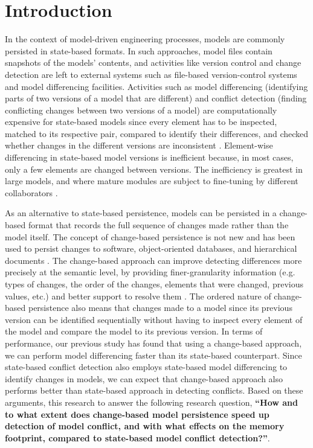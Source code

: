 \section{Introduction}
\label{sec:introduction}

In the context of model-driven engineering processes, models are commonly persisted in state-based formats. In such approaches, model files contain snapshots of the models' contents, and activities like version control and change detection are left to external systems such as file-based version-control systems and model differencing facilities. Activities such as model differencing (identifying parts of two versions of a model that are different) and conflict detection (finding conflicting changes between two versions of a model) are computationally expensive for state-based models \cite{Kolovos:2009:DMM:1564596.1564641} since every element has to be inspected, matched to its respective pair, compared to identify their differences, and checked whether changes in the different versions are inconsistent \cite{emfcompare2018developer}. Element-wise differencing in state-based model versions is inefficient because, in most cases, only a few elements are changed between versions. The inefficiency is greatest in large models, and where mature modules are subject to fine-tuning by different collaborators \cite{selic2003pragmatics}. 

As an alternative to state-based persistence, models can be persisted in a change-based format that records the full sequence of changes made rather than the model itself. The concept of change-based persistence is not new and has been used to persist changes to software, object-oriented databases, and hierarchical documents \cite{DBLP:journals/entcs/RobbesL07,DBLP:conf/sde/LippeO92,DBLP:conf/caise/IgnatN05}. The change-based approach can improve detecting differences more precisely at the semantic level, by providing finer-granularity information (e.g. types of changes, the order of the changes, 
elements that were changed, previous values, etc.) and better support to resolve them \cite{mens2002state}. The ordered nature of change-based persistence also means that changes made to a model since its previous version can be identified sequentially without having to inspect every element of the model and compare the model to its previous version. 
In terms of performance, our previous study \cite{yohannis2019efficient} has found that using a change-based approach, we can perform model differencing faster than its state-based counterpart. Since state-based conflict detection also employs state-based model differencing to identify changes in models, we can expect that change-based approach also performs better than state-based approach in detecting conflicts. Based on these arguments, this research to answer the following research question, \textbf{``How and to what extent does change-based model persistence speed up detection of model conflict, and with what effects on the memory footprint, compared to state-based model conflict detection?''}. 

